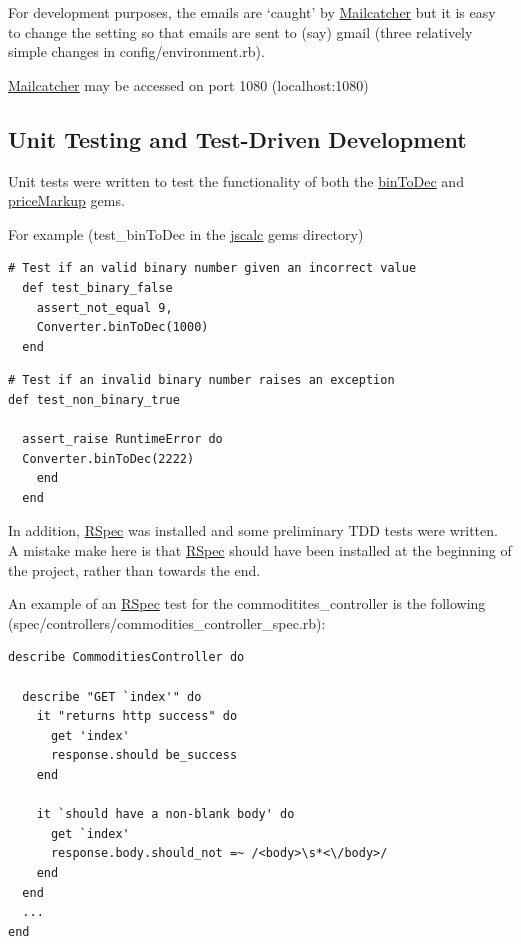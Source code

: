 \documentclass[11pt]{article}
\begin{document}
For development purposes, the emails are `caught' by
\href{https://rubygems.org/gems/mailcatcher/}{Mailcatcher}
but it is  easy to change the setting so that emails are sent to (say) gmail 
(three relatively simple changes in config/environment.rb). 

\href{https://rubygems.org/gems/mailcatcher/}{Mailcatcher} may be accessed on port 1080 (localhost:1080)

\subsection{Unit Testing and Test-Driven Development}
Unit tests were written to test the functionality of both
the 
\href{https://rubygems.org/gems/jscalc}{binToDec} 
and 
\href{https://rubygems.org/gems/priceMarkup}{priceMarkup} 
gems.

 
For example (test\_binToDec in the \href{https://rubygems.org/gems/jscalc}{jscalc} gems directory)

\begin{verbatim}
# Test if an valid binary number given an incorrect value
  def test_binary_false
    assert_not_equal 9,
    Converter.binToDec(1000)
  end
\end{verbatim}
\begin{verbatim}
# Test if an invalid binary number raises an exception
def test_non_binary_true
  
  assert_raise RuntimeError do
  Converter.binToDec(2222)
    end
  end
\end{verbatim}
In addition, 
\href{http://rspec.info/}{RSpec} was installed and some
preliminary TDD tests were written. 
A mistake make here is that
\href{http://rspec.info/}{RSpec}
 should have been installed at the beginning of the project, rather
than towards the end. 

An example of an \href{http://rspec.info/}{RSpec} test for the commoditites\_controller is the following (spec/controllers/commodities\_controller\_spec.rb): 
\begin{verbatim}
describe CommoditiesController do

  describe "GET `index'" do
    it "returns http success" do
      get 'index'
      response.should be_success
    end

    it `should have a non-blank body' do
      get `index'
      response.body.should_not =~ /<body>\s*<\/body>/
    end
  end
  ...
end
\end{verbatim}
\end{document}
